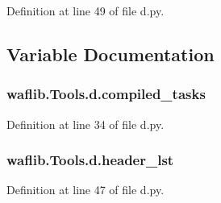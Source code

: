 Definition at line 49 of file d.\+py.



\subsection{Variable Documentation}
\subsubsection[{\texorpdfstring{compiled\+\_\+tasks}{compiled_tasks}}]{\setlength{\rightskip}{0pt plus 5cm}waflib.\+Tools.\+d.\+compiled\+\_\+tasks}\hypertarget{namespacewaflib_1_1_tools_1_1d_abcc48a86109544aa296665ef072cd152}{}\label{namespacewaflib_1_1_tools_1_1d_abcc48a86109544aa296665ef072cd152}


Definition at line 34 of file d.\+py.

\subsubsection[{\texorpdfstring{header\+\_\+lst}{header_lst}}]{\setlength{\rightskip}{0pt plus 5cm}waflib.\+Tools.\+d.\+header\+\_\+lst}\hypertarget{namespacewaflib_1_1_tools_1_1d_a12bd52b8e8678fe7ca13904115bafb4e}{}\label{namespacewaflib_1_1_tools_1_1d_a12bd52b8e8678fe7ca13904115bafb4e}


Definition at line 47 of file d.\+py.

